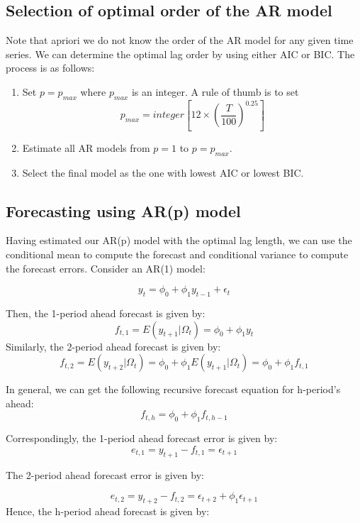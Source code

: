 \documentclass[]{book}
\theoremstyle{definition}
\theoremstyle{definition}
\theoremstyle{definition}
\theoremstyle{remark}
\begin{document}
\hypertarget{selection-of-optimal-order-of-the-ar-model}{%
\subsection{Selection of optimal order of the AR
model}\label{selection-of-optimal-order-of-the-ar-model}}

Note that apriori we do not know the order of the AR model for any given
time series. We can determine the optimal lag order by using either AIC
or BIC. The process is as follows:

\begin{enumerate}
\def\labelenumi{\arabic{enumi}.}
\item
  Set \(p=p_{max}\) where \(p_{max}\) is an integer. A rule of thumb is
  to set
  \[p_{max}=integer\left[12\times \left(\frac{T}{100}\right)^{0.25}\right]\]
\item
  Estimate all AR models from \(p=1\) to \(p=p_{max}\).
\item
  Select the final model as the one with lowest AIC or lowest BIC.
\end{enumerate}

\hypertarget{forecasting-using-arp-model}{%
\subsection{Forecasting using AR(p)
model}\label{forecasting-using-arp-model}}

Having estimated our AR(p) model with the optimal lag length, we can use
the conditional mean to compute the forecast and conditional variance to
compute the forecast errors. Consider an AR(1) model:

\[y_t=\phi_0+\phi_1 y_{t-1} +\epsilon_t\]

Then, the 1-period ahead forecast is given by:
\[f_{t,1}=E(y_{t+1}|\Omega_t)=\phi_0+\phi_1 y_t\] Similarly, the
2-period ahead forecast is given by:
\[f_{t,2}=E(y_{t+2}|\Omega_t)=\phi_0+\phi_1 E(y_{t+1}|\Omega_t) =\phi_0+\phi_1f_{t,1}\]

In general, we can get the following recursive forecast equation for
h-period's ahead: \[f_{t,h}=\phi_0+\phi_1 f_{t,h-1}\]

Correspondingly, the 1-period ahead forecast error is given by:
\[e_{t,1}=y_{t+1}- f_{t,1}=\epsilon_{t+1}\]

The 2-period ahead forecast error is given by:

\[e_{t,2}=y_{t+2}-f_{t,2}=\epsilon_{t+2}+\phi_1 \epsilon_{t+1} \] Hence,
the h-period ahead forecast is given by:
\end{document}
